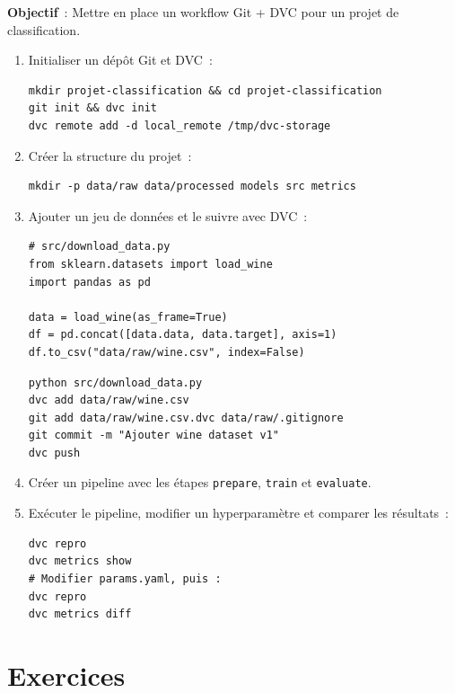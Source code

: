 \begin{miniprojet}[title=\textbf{Versionner un projet ML complet avec Git et DVC}]
\textbf{Objectif}~: Mettre en place un workflow Git + DVC pour un projet de
classification.

\begin{enumerate}
  \item Initialiser un d\'ep\^ot Git et DVC~:
\begin{verbatim}
mkdir projet-classification && cd projet-classification
git init && dvc init
dvc remote add -d local_remote /tmp/dvc-storage
\end{verbatim}

  \item Cr\'eer la structure du projet~:
\begin{verbatim}
mkdir -p data/raw data/processed models src metrics
\end{verbatim}

  \item Ajouter un jeu de donn\'ees et le suivre avec DVC~:
\begin{verbatim}
# src/download_data.py
from sklearn.datasets import load_wine
import pandas as pd

data = load_wine(as_frame=True)
df = pd.concat([data.data, data.target], axis=1)
df.to_csv("data/raw/wine.csv", index=False)
\end{verbatim}

\begin{verbatim}
python src/download_data.py
dvc add data/raw/wine.csv
git add data/raw/wine.csv.dvc data/raw/.gitignore
git commit -m "Ajouter wine dataset v1"
dvc push
\end{verbatim}

  \item Cr\'eer un pipeline  avec les \'etapes \texttt{prepare},
        \texttt{train} et \texttt{evaluate}.

  \item Ex\'ecuter le pipeline, modifier un hyperparam\`etre et comparer les
        r\'esultats~:
\begin{verbatim}
dvc repro
dvc metrics show
# Modifier params.yaml, puis :
dvc repro
dvc metrics diff
\end{verbatim}
\end{enumerate}
\end{miniprojet}

\section{Exercices}
\label{sec:exos-version-control}

